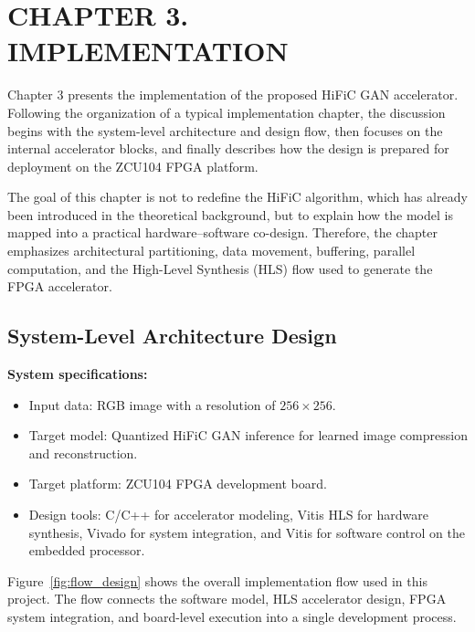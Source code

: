 \newpage
\section*{CHAPTER 3. IMPLEMENTATION}
\setcounter{section}{3}
\setcounter{figure}{0}
\setcounter{subsection}{0}
\setcounter{subsubsection}{0}
\setcounter{paragraph}{0}
\setcounter{table}{0}

Chapter 3 presents the implementation of the proposed HiFiC GAN accelerator. Following the organization of a typical implementation chapter, the discussion begins with the system-level architecture and design flow, then focuses on the internal accelerator blocks, and finally describes how the design is prepared for deployment on the ZCU104 FPGA platform.

The goal of this chapter is not to redefine the HiFiC algorithm, which has already been introduced in the theoretical background, but to explain how the model is mapped into a practical hardware--software co-design. Therefore, the chapter emphasizes architectural partitioning, data movement, buffering, parallel computation, and the High-Level Synthesis (HLS) flow used to generate the FPGA accelerator.

\subsection{System-Level Architecture Design}

\textbf{System specifications:}
\begin{itemize}
    \item Input data: RGB image with a resolution of $256 \times 256$.
    \item Target model: Quantized HiFiC GAN inference for learned image compression and reconstruction.
    \item Target platform: ZCU104 FPGA development board.
    \item Design tools: C/C++ for accelerator modeling, Vitis HLS for hardware synthesis, Vivado for system integration, and Vitis for software control on the embedded processor.
\end{itemize}

Figure~\ref{fig:flow_design} shows the overall implementation flow used in this project. The flow connects the software model, HLS accelerator design, FPGA system integration, and board-level execution into a single development process.

